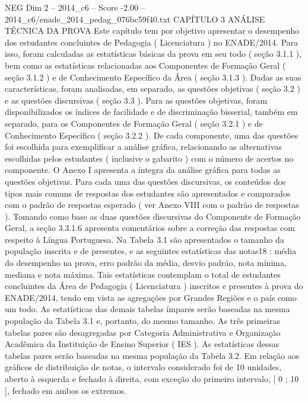 \begin{textsample}{NEG Dim 2 – 2014\_c6 – Score -2.00 – 2014\_c6/enade\_2014\_pedag\_076bc59f40.txt}  \label{ex:f2_neg_203}
CAPÍTULO 3 ANÁLISE TÉCNICA DA PROVA Este capítulo tem por objetivo apresentar o desempenho dos estudantes concluintes de Pedagogia ( Licenciatura ) no ENADE/2014.
Para isso, foram calculadas as estatísticas básicas da prova em seu todo ( seção 3.1.1 ), bem como as estatísticas relacionadas aos Componentes de Formação Geral ( seção 3.1.2 ) e de Conhecimento Específico da Área ( seção 3.1.3 ).
Dadas as suas características, foram analisadas, em separado, as questões objetivas ( seção 3.2 ) e as questões discursivas ( seção 3.3 ).
Para as questões objetivas, foram disponibilizados os índices de facilidade e de discriminação bisserial, também em separado, para os Componentes de Formação Geral ( seção 3.2.1 ) e de Conhecimento Específico ( seção 3.2.2 ).
De cada componente, uma das questões foi escolhida para exemplificar a análise gráfica, relacionando as alternativas escolhidas pelos estudantes ( inclusive o gabarito ) com o número de acertos no componente.
O Anexo I apresenta a íntegra da análise gráfica para todas as questões objetivas.
Para cada uma das questões discursivas, os conteúdos dos tipos mais comuns de respostas dos estudantes são apresentados e comparados com o padrão de respostas esperado ( ver Anexo VIII com o padrão de respostas ).
Tomando como base as duas questões discursivas do Componente de Formação Geral, a seção 3.3.1.6 apresenta comentários sobre a correção das respostas com respeito à Língua Portuguesa.
Na Tabela 3.1 são apresentados o tamanho da população inscrita e de presentes, e as seguintes estatísticas das notas18 : média do desempenho na prova, erro padrão da média, desvio padrão, nota mínima, mediana e nota máxima.
Tais estatísticas contemplam o total de estudantes concluintes da Área de Pedagogia ( Licenciatura ) inscritos e presentes à prova do ENADE/2014, tendo em vista as agregações por Grandes Regiões e o país como um todo.
As estatísticas das demais tabelas ímpares serão baseadas na mesma população da Tabela 3.1 e, portanto, do mesmo tamanho.
As três primeiras tabelas pares são desagregadas por Categoria Administrativa e Organização Acadêmica da Instituição de Ensino Superior ( IES ).
As estatísticas dessas tabelas pares serão baseadas na mesma população da Tabela 3.2.
Em relação aos gráficos de distribuição de notas, o intervalo considerado foi de 10 unidades, aberto à esquerda e fechado à direita, com exceção do primeiro intervalo, [ 0 ; 10 ], fechado em ambos os extremos.

\end{textsample}
